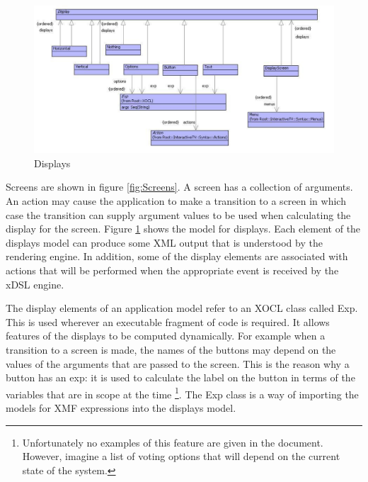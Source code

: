 %
\begin{figure}
\begin{center}

\includegraphics[width=12cm]{LanguageEngineering/Interactive/Images/Displays}

\caption{Displays\label{fig:Displays}}

\end{center}
\end{figure}


Screens are shown in figure \ref{fig:Screens}. A screen has a collection
of arguments. An action may cause the application to make a transition
to a screen in which case the transition can supply argument values
to be used when calculating the display for the screen. Figure \ref{fig:Displays}
shows the model for displays. Each element of the displays model can
produce some XML output that is understood by the rendering engine.
In addition, some of the display elements are associated with actions
that will be performed when the appropriate event is received by the
xDSL engine.

The display elements of an application model refer to an XOCL class
called Exp. This is used wherever an executable fragment of code is
required. It allows features of the displays to be computed dynamically.
For example when a transition to a screen is made, the names of the
buttons may depend on the values of the arguments that are passed
to the screen. This is the reason why a button has an exp: it is used
to calculate the label on the button in terms of the variables that
are in scope at the time%
\footnote{Unfortunately no examples of this feature are given in the document.
However, imagine a list of voting options that will depend on the
current state of the system.%
}. The Exp class is a way of importing the models for XMF expressions
into the displays model.

